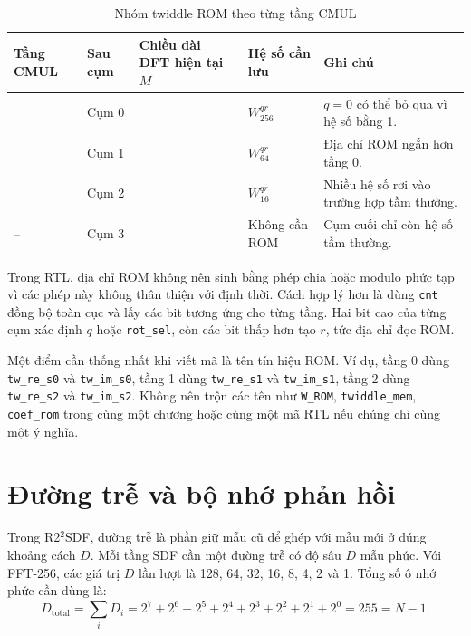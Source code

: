 \documentclass[12pt,a4paper]{report}
\numberwithin{equation}{chapter}
\begin{document}
\begin{table}[H]
    \centering
    \caption{Nhóm twiddle ROM theo từng tầng CMUL}
    \label{tab:r22rtl_twiddle_rom}
    \small
    \begin{tabularx}{\textwidth}{>{\centering\arraybackslash}p{1.8cm}>{\centering\arraybackslash}p{1.8cm}>{\centering\arraybackslash}p{2.8cm}>{\centering\arraybackslash}p{3cm}X}
        \toprule
        \textbf{Tầng CMUL} & \textbf{Sau cụm} & \textbf{Chiều dài DFT hiện tại $M$} & \textbf{Hệ số cần lưu} & \textbf{Ghi chú} \\
        \midrule
        0 & Cụm 0 & 256 & $W_{256}^{qr}$ & $q=0$ có thể bỏ qua vì hệ số bằng 1. \\
        1 & Cụm 1 & 64 & $W_{64}^{qr}$ & Địa chỉ ROM ngắn hơn tầng 0. \\
        2 & Cụm 2 & 16 & $W_{16}^{qr}$ & Nhiều hệ số rơi vào trường hợp tầm thường. \\
        -- & Cụm 3 & 4 & Không cần ROM & Cụm cuối chỉ còn hệ số tầm thường. \\
        \bottomrule
    \end{tabularx}
\end{table}

Trong RTL, địa chỉ ROM không nên sinh bằng phép chia hoặc modulo phức tạp vì các phép này không thân thiện với định thời. Cách hợp lý hơn là dùng \texttt{cnt} đồng bộ toàn cục và lấy các bit tương ứng cho từng tầng. Hai bit cao của từng cụm xác định $q$ hoặc \texttt{rot\_sel}, còn các bit thấp hơn tạo $r$, tức địa chỉ đọc ROM.

Một điểm cần thống nhất khi viết mã là tên tín hiệu ROM. Ví dụ, tầng 0 dùng \texttt{tw\_re\_s0} và \texttt{tw\_im\_s0}, tầng 1 dùng \texttt{tw\_re\_s1} và \texttt{tw\_im\_s1}, tầng 2 dùng \texttt{tw\_re\_s2} và \texttt{tw\_im\_s2}. Không nên trộn các tên như \texttt{W\_ROM}, \texttt{twiddle\_mem}, \texttt{coef\_rom} trong cùng một chương hoặc cùng một mã RTL nếu chúng chỉ cùng một ý nghĩa.

\section{Đường trễ và bộ nhớ phản hồi}
\label{sec:r22rtl_delay_line}

Trong R2$^2$SDF, đường trễ là phần giữ mẫu cũ để ghép với mẫu mới ở đúng khoảng cách $D$. Mỗi tầng SDF cần một đường trễ có độ sâu $D$ mẫu phức. Với FFT-256, các giá trị $D$ lần lượt là 128, 64, 32, 16, 8, 4, 2 và 1. Tổng số ô nhớ phức cần dùng là:
\begin{equation}
    D_{\mathrm{total}}
    =\sum_i D_i
    =2^7+2^6+2^5+2^4+2^3+2^2+2^1+2^0
    =255=N-1.
    \label{eq:r22rtl_delay_total_sum}
\end{equation}
\end{document}
